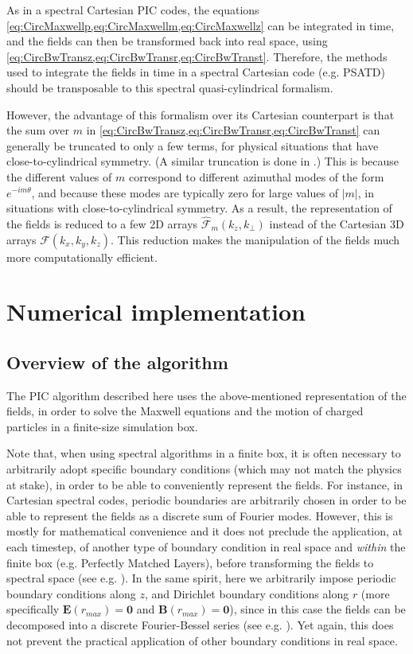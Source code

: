 \documentclass[1p,times]{elsarticle}
\renewcommand{\vec}[1]{\boldsymbol{#1}}
\newcommand{\spectral}[1]{\hat{\mathcal{#1}}}
\begin{document}
As in a spectral Cartesian PIC codes, the equations
\cref{eq:CircMaxwellp,eq:CircMaxwellm,eq:CircMaxwellz}  
can be integrated in time, and the fields can then be transformed back into
real space, using \cref{eq:CircBwTransz,eq:CircBwTransr,eq:CircBwTranst}. Therefore,
the methods used to integrate the fields in time in a spectral Cartesian
code (e.g. PSATD) should be transposable to this spectral quasi-cylindrical formalism.

However, the advantage of this formalism over its Cartesian
counterpart is that the sum over $m$ in
\cref{eq:CircBwTransz,eq:CircBwTransr,eq:CircBwTranst} can generally
be truncated to only a few terms, for physical situations that have
close-to-cylindrical symmetry. (A similar truncation is done in \cite{Lifschitz}.) This is because the
different values of $m$ correspond to different azimuthal modes of the
form $e^{-im\theta}$, and because these modes are typically zero for
large values of $|m|$, in situations with close-to-cylindrical symmetry.
As a result, the representation of the fields is
reduced to a few 2D arrays $\spectral{F}_m(k_z,k_\perp )$ instead of the
Cartesian 3D arrays $\mathcal{F}(k_x,k_y,k_z)$. This reduction makes
the manipulation of the fields much more computationally efficient.

\section{Numerical implementation}
\label{sec:implementation}

\subsection{Overview of the algorithm}

The PIC algorithm described here uses the above-mentioned representation
of the fields, in order to solve the Maxwell equations and the motion
of charged particles in a finite-size simulation box.

Note that, when using spectral algorithms in a finite box, it is often
necessary to arbitrarily adopt specific boundary conditions (which may not
match the physics at stake), in order to be able to
conveniently represent the fields. For instance, in Cartesian spectral
codes, periodic boundaries are arbitrarily chosen in order to be able
to represent the fields as a discrete sum of Fourier modes. However, this is mostly
for mathematical convenience and it does not preclude the application,
at each timestep, of another type of boundary condition in real space
and \emph{within} the finite box (e.g. Perfectly Matched Layers),
before transforming the fields to spectral space (see
e.g. \cite{Vincenti2015,LeeCPC2015}). In the same spirit, here we arbitrarily
impose periodic boundary conditions along $z$, and Dirichlet
boundary conditions along $r$ (more specifically $\vec{E}(r_{max})=\vec{0}$ and
$\vec{B}(r_{max})=\vec{0}$), since in this case the fields can be
decomposed into a discrete Fourier-Bessel series
(see e.g. \cite{Guizar}). Yet again, this does not prevent the
practical application of other boundary conditions in real space. 
\end{document}

